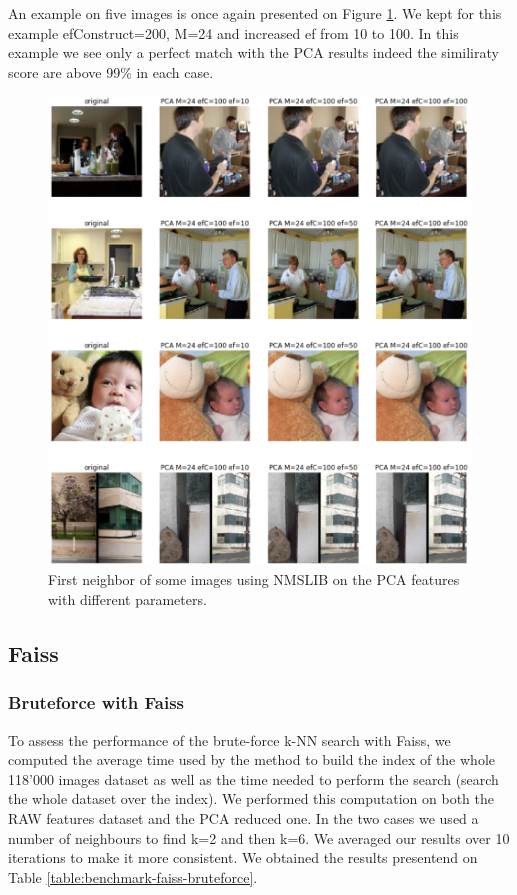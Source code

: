 \documentclass[a4paper]{article}
\begin{document}
An example on five images is once again presented on Figure \ref{fig:visual-nmslib}. We kept for this example efConstruct=200, M=24 and increased ef from 10 to 100. In this example we see only a perfect match with the PCA results indeed the similiraty score are above 99\% in each case.  

\begin{figure}[h]
	\includegraphics[width=\textwidth]{visual-nmslib}
	\caption{First neighbor of some images using NMSLIB on the PCA features with different parameters.}
	\label{fig:visual-nmslib}
\end{figure}

	\subsection{Faiss}

\subsubsection{Bruteforce with Faiss}

To assess the performance of the brute-force k-NN search with Faiss, we computed the average time used by the method to build the index of the whole 118'000 images dataset as well as the time needed to perform the search (search the whole dataset over the index). We performed this computation on both the RAW features dataset and the PCA reduced one. In the two cases we used a number of neighbours to find k=2 and then k=6. We averaged our results over 10 iterations to make it more consistent. We obtained the results presentend on Table \ref{table:benchmark-faiss-bruteforce}.
\end{document}
